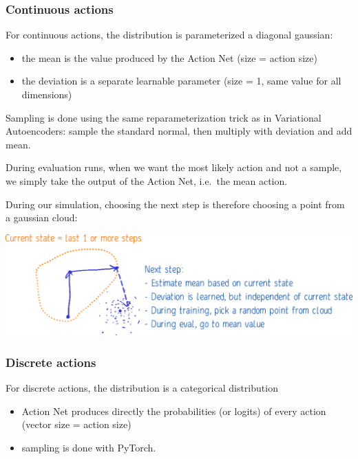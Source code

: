\documentclass[
  letterpaper,
  DIV=11,
  numbers=noendperiod]{scrartcl}
\providecommand{\tightlist}{%
  \setlength{\itemsep}{0pt}\setlength{\parskip}{0pt}}\usepackage{longtable,booktabs,array}
\begin{document}
\subsubsection{Continuous actions}\label{continuous-actions}

For continuous actions, the distribution is parameterized a diagonal
gaussian:

\begin{itemize}
\tightlist
\item
  the mean is the value produced by the Action Net (size = action size)
\item
  the deviation is a separate learnable parameter (size = 1, same value
  for all dimensions)
\end{itemize}

Sampling is done using the same reparameterization trick as in
Variational Autoencoders: sample the standard normal, then multiply with
deviation and add mean.

During evaluation runs, when we want the most likely action and not a
sample, we simply take the output of the Action Net, i.e.~the mean
action.

During our simulation, choosing the next step is therefore choosing a
point from a gaussian cloud:

\hfill\break

\includegraphics{img/Explanation.png}

\subsubsection{Discrete actions}\label{discrete-actions}

For discrete actions, the distribution is a categorical distribution

\begin{itemize}
\tightlist
\item
  Action Net produces directly the probabilities (or logits) of every
  action (vector size = action size)
\item
  sampling is done with PyTorch.
\end{itemize}
\end{document}

